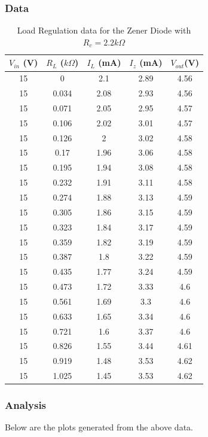\documentclass[10pt]{scrartcl}
\theoremstyle{definition}
\begin{document}
\subsubsection{Data}
\begin{table}[!h]
    \centering
    \caption{Load Regulation data for the Zener Diode with $R_c = 2.2 k\Omega$}
    \begin{tabular}{|c|c|c|c|c|}
    \hline
        \textbf{$V_{in}$ (V)} & \textbf{ $R_L$ ($k\Omega$)} & \textbf{$I_L$ (mA)} & \textbf{$I_z$ (mA)} & \textbf{$V_{out}$(V)} \\ \hline
        15 & 0 & 2.1 & 2.89 & 4.56 \\ \hline
        15 & 0.034 & 2.08 & 2.93 & 4.56 \\ \hline
        15 & 0.071 & 2.05 & 2.95 & 4.57 \\ \hline
        15 & 0.106 & 2.02 & 3.01 & 4.57 \\ \hline
        15 & 0.126 & 2 & 3.02 & 4.58 \\ \hline
        15 & 0.17 & 1.96 & 3.06 & 4.58 \\ \hline
        15 & 0.195 & 1.94 & 3.08 & 4.58 \\ \hline
        15 & 0.232 & 1.91 & 3.11 & 4.58 \\ \hline
        15 & 0.274 & 1.88 & 3.13 & 4.59 \\ \hline
        15 & 0.305 & 1.86 & 3.15 & 4.59 \\ \hline
        15 & 0.323 & 1.84 & 3.17 & 4.59 \\ \hline
        15 & 0.359 & 1.82 & 3.19 & 4.59 \\ \hline
        15 & 0.387 & 1.8 & 3.22 & 4.59 \\ \hline
        15 & 0.435 & 1.77 & 3.24 & 4.59 \\ \hline
        15 & 0.473 & 1.72 & 3.33 & 4.6 \\ \hline
        15 & 0.561 & 1.69 & 3.3 & 4.6 \\ \hline
        15 & 0.633 & 1.65 & 3.34 & 4.6 \\ \hline
        15 & 0.721 & 1.6 & 3.37 & 4.6 \\ \hline
        15 & 0.826 & 1.55 & 3.44 & 4.61 \\ \hline
        15 & 0.919 & 1.48 & 3.53 & 4.62 \\ \hline
        15 & 1.025 & 1.45 & 3.53 & 4.62 \\ \hline
    \end{tabular}
\end{table}
\subsubsection{Analysis}
Below are the plots generated from the above data.
\end{document}
